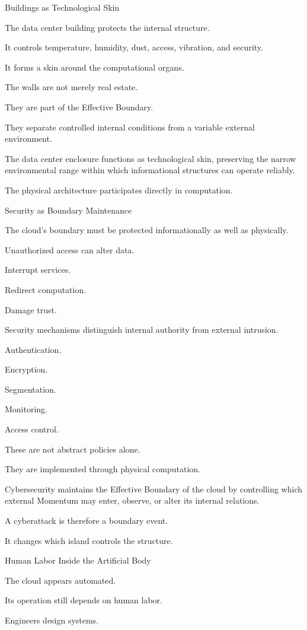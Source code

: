 Buildings as Technological Skin

The data center building protects the internal structure.

It controls temperature, humidity, dust, access, vibration, and security.

It forms a skin around the computational organs.

The walls are not merely real estate.

They are part of the Effective Boundary.

They separate controlled internal conditions from a variable external environment.

The data center enclosure functions as technological skin, preserving the narrow environmental range within which informational structures can operate reliably.

The physical architecture participates directly in computation.

Security as Boundary Maintenance

The cloud’s boundary must be protected informationally as well as physically.

Unauthorized access can alter data.

Interrupt services.

Redirect computation.

Damage trust.

Security mechanisms distinguish internal authority from external intrusion.

Authentication.

Encryption.

Segmentation.

Monitoring.

Access control.

These are not abstract policies alone.

They are implemented through physical computation.

Cybersecurity maintains the Effective Boundary of the cloud by controlling which external Momentum may enter, observe, or alter its internal relations.

A cyberattack is therefore a boundary event.

It changes which island controls the structure.

Human Labor Inside the Artificial Body

The cloud appears automated.

Its operation still depends on human labor.

Engineers design systems.

